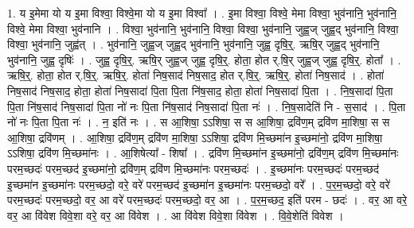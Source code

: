 \documentclass[17pt]{extarticle}
\begin{document}
1. य इ॒मेमा यो य इ॒मा विश्वा॒ विश्वे॒मा यो य इ॒मा विश्वा᳚ । . इ॒मा विश्वा॒ विश्वे॒ मेमा विश्वा॒ भुव॑नानि॒ भुव॑नानि॒ विश्वे॒ मेमा विश्वा॒ भुव॑नानि । . विश्वा॒ भुव॑नानि॒ भुव॑नानि॒ विश्वा॒ विश्वा॒ भुव॑नानि॒ जुह्व॒ज् जुह्व॒द् भुव॑नानि॒ विश्वा॒ विश्वा॒ भुव॑नानि॒ जुह्व॑त् । . भुव॑नानि॒ जुह्व॒ज् जुह्व॒द् भुव॑नानि॒ भुव॑नानि॒ जुह्व॒ दृषि॒र्॒. ऋषि॒र् जुह्व॒द् भुव॑नानि॒ भुव॑नानि॒ जुह्व॒ दृषिः॑ । . जुह्व॒ दृषि॒र्॒. ऋषि॒र् जुह्व॒ज् जुह्व॒ दृषि॒र्॒. होता॒ होत र्.षि॒र् जुह्व॒ज् जुह्व॒ दृषि॒र्॒. होता᳚ । . ऋषि॒र्॒. होता॒ होत र्.षि॒र्॒. ऋषि॒र्॒. होता॑ निष॒साद॑ निष॒साद॒ होत र्.षि॒र्॒. ऋषि॒र्॒. होता॑ निष॒साद॑ । . होता॑ निष॒साद॑ निष॒साद॒ होता॒ होता॑ निष॒सादा॑ पि॒ता पि॒ता नि॑ष॒साद॒ होता॒ होता॑ निष॒सादा॑ पि॒ता । . नि॒ष॒सादा॑ पि॒ता पि॒ता नि॑ष॒साद॑ निष॒सादा॑ पि॒ता नो॑ नः पि॒ता नि॑ष॒साद॑ निष॒सादा॑ पि॒ता नः॑ । . नि॒ष॒सादेति॑ नि - स॒साद॑ । . पि॒ता नो॑ नः पि॒ता पि॒ता नः॑ । . न॒ इति॑ नः । . स आ॒शिषा॒ ऽऽशिषा॒ स स आ॒शिषा॒ द्रवि॑ण॒म् द्रवि॑ण मा॒शिषा॒ स स आ॒शिषा॒ द्रवि॑णम् । . आ॒शिषा॒ द्रवि॑ण॒म् द्रवि॑ण मा॒शिषा॒ ऽऽशिषा॒ द्रवि॑ण मि॒च्छमा॑न इ॒च्छमा॑नो॒ द्रवि॑ण मा॒शिषा॒ ऽऽशिषा॒ द्रवि॑ण मि॒च्छमा॑नः । . आ॒शिषेत्या᳚ - शिषा᳚ । . द्रवि॑ण मि॒च्छमा॑न इ॒च्छमा॑नो॒ द्रवि॑ण॒म् द्रवि॑ण मि॒च्छमा॑नः परम॒च्छदः॑ परम॒च्छद॑ इ॒च्छमा॑नो॒ द्रवि॑ण॒म् द्रवि॑ण मि॒च्छमा॑नः परम॒च्छदः॑ । . इ॒च्छमा॑नः परम॒च्छदः॑ परम॒च्छद॑ इ॒च्छमा॑न इ॒च्छमा॑नः परम॒च्छदो॒ वरे॒ वरे॑ परम॒च्छद॑ इ॒च्छमा॑न इ॒च्छमा॑नः परम॒च्छदो॒ वरे᳚ । . प॒र॒म॒च्छदो॒ वरे॒ वरे॑ परम॒च्छदः॑ परम॒च्छदो॒ वर॒ आ वरे॑ परम॒च्छदः॑ परम॒च्छदो॒ वर॒ आ । . प॒र॒म॒च्छद॒ इति॑ परम - छदः॑ । . वर॒ आ वरे॒ वर॒ आ वि॑वेश विवे॒शा वरे॒ वर॒ आ वि॑वेश । . आ वि॑वेश विवे॒शा वि॑वेश । . वि॒वे॒शेति॑ विवेश । \newline
\end{document}

